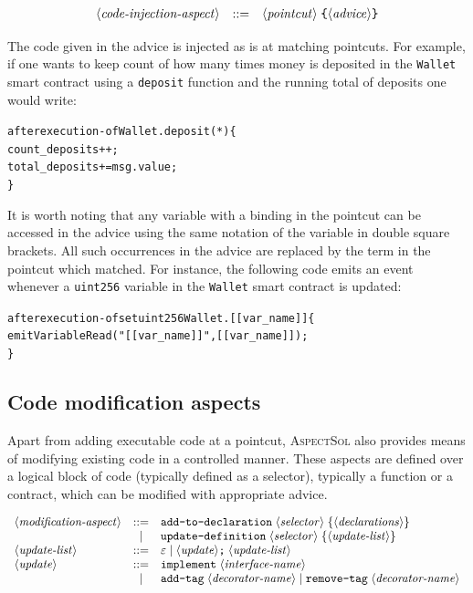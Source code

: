 \documentclass{article}
\newcommand{\AspectSol}{\textsc{AspectSol}\xspace}
\newcommand{\variable}[1]{\ensuremath{\langle\textrm{\textit{#1}}\rangle}}
\begin{document}
\[\begin{array}{lcl}
\variable{code-injection-aspect} & ::= &
\variable{pointcut}\; \texttt{\{} \variable{advice} \texttt{\}}
\end{array}\]

The code given in the advice is injected as is at matching pointcuts. For example, if one wants to keep count of how many times money is deposited in the \texttt{Wallet} smart contract using a \texttt{deposit} function and the running total of deposits one would write:
    \begin{alltt}
after execution-of Wallet.deposit(*) \{ 
    count\_deposits++;
    total\_deposits += msg.value;
\}
    \end{alltt}

It is worth noting that any variable with a binding in the pointcut can be  accessed in the advice using the same notation of the variable in double square brackets. All such occurrences in the advice are replaced by the term in the pointcut which matched. For instance, the following code emits an event whenever a \texttt{uint256} variable in the \texttt{Wallet} smart contract is updated:

    \begin{alltt}
after execution-of set uint256 Wallet.[[var\_name]] \{
  emit VariableRead("[[var\_name]]", [[var\_name]]);
\}
    \end{alltt}

\subsection{Code modification aspects}
Apart from adding executable code at a pointcut, \AspectSol also provides means of modifying existing code in a controlled manner. These aspects are defined over a logical block of code (typically defined as a selector), typically a function or a contract, which can be modified with appropriate advice.

\[\begin{array}{lcl}
\variable{modification-aspect} & ::= &
\texttt{add-to-declaration}\;\variable{selector}\;\{ \variable{declarations} \}\\
&\mid&
\texttt{update-definition}\;\variable{selector}\;\{ \variable{update-list} \}\\
\variable{update-list} & ::= & \varepsilon \mid \variable{update}\texttt{;}\;\variable{update-list}\\
\variable{update} & ::= & 
\texttt{implement}\;\variable{interface-name} \\
& \mid & \texttt{add-tag}\;\variable{decorator-name} \mid \texttt{remove-tag}\;\variable{decorator-name}
\end{array}\]
\end{document}

